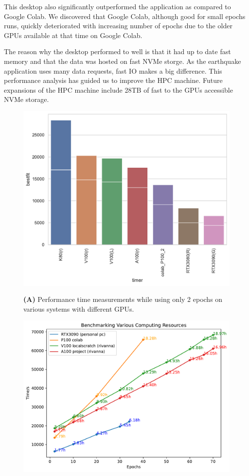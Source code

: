 \documentclass[utf8]{FrontiersinVancouver} %
\begin{document}
{This desktop also significantly outperformed the application as
compared to Google Colab. We discovered that Google Colab, although
good for small epochs runs, quickly deteriorated with increasing
number of epochs due to the older GPUs available at that time on
Google Colab.

The reason why the desktop performed to well is that it had up to date
fast memory and that the data was hosted on fast NVMe storge. As the
earthquake application uses many data requests, fast IO makes a big
difference. This performance analysis has guided us to improve the HPC
machine. Future expansions of the HPC machine include 28TB of fast to
the GPUs accessible NVMe storage.

\begin{figure}[p]

  \centering\includegraphics[width=0.75\columnwidth]{images/Graphics_Cards_BestFit_bar.pdf}

  {\bf (A)} Performance time measurements while using only 2 epochs on
  various systems with different GPUs.

  \centering\includegraphics[width=0.75\columnwidth]{images/Benchmark_comp_resource.pdf}


\end{figure}}
\end{document}

